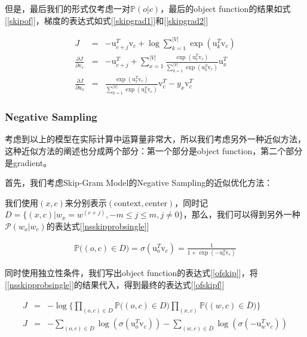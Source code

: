 \documentclass{article}
\begin{document}
但是，最后我们的形式仅考虑一对$\mathbb{P}(o\lvert c)$，最后的object function的结果如式[\ref{skipof}]，梯度的表达式如式[\ref{skipgrad1}]和[\ref{skipgrad2}]

\begin{eqnarray}
\label{skipof}
J &=& -\mathrm{u}_{c+j}^T\mathrm{v}_c + \log\sum_{k=1}^{\lvert V\rvert}{\exp(\mathrm{u}_k^T\mathrm{v}_c)} \\
\label{skipgrad1}
\frac{\partial J}{\partial \mathrm{v}_c}&=&-\mathrm{u}_{c+j}^T+\sum_{x=1}^{\lvert V\rvert}{\frac{\exp(\mathrm{u}_x^T\mathrm{v}_c)}{\sum_{k=1}^{\lvert V\rvert}{\exp(\mathrm{u}_k^T\mathrm{v}_c)}}\mathrm{u}_x^T} \\
\label{skipgrad2}
\frac{\partial J}{\partial \mathrm{u}_x}&=&\frac{\exp(\mathrm{u}_x^T\mathrm{v}_c)}{\sum_{k=1}^{\lvert V\rvert}{\exp(\mathrm{u}_k^T\mathrm{v}_c)}}\mathrm{v}_c^T - y_x\mathrm{v}_c^T
\end{eqnarray}

\subsubsection*{Negative Sampling}

考虑到以上的模型在实际计算中运算量非常大，所以我们考虑另外一种近似方法，这种近似方法的阐述也分成两个部分：第一个部分是object function，第二个部分是gradient。

首先，我们考虑Skip-Gram Model的Negative Sampling的近似优化方法：

我们使用$(x,c)$来分别表示$(\text{context},\text{center})$，同时记$D=\{(x,c)\lvert w_x=w^{(c+j)}, -m\le j\le m, j\neq 0\}$，那么，我们可以得到另外一种$\mathcal{P}(w_o\lvert w_c)$的表达式[\ref{nsskipprobsingle}]

\begin{eqnarray}
\label{nsskipprobsingle}
\mathbb{P}\big((o,c)\in D\big) = \sigma(\mathrm{u}_o^T\mathrm{v}_c) = \frac{1}{1+\exp(-\mathrm{u}_o^T\mathrm{v}_c)}
\end{eqnarray}

同时使用独立性条件，我们写出object function的表达式[\ref{ofskip}]，将[\ref{nsskipprobsingle}]的结果代入，得到最终的表达式[\ref{ofskipf}]

\begin{eqnarray}
\label{ofskip}
J &=& -\log\Big\{\prod_{(o,c) \in D}{\mathbb{P}\big((o,c) \in D\big)}\prod_{(x,c)}{\mathbb{P}\big((w,c) \in \bar{D}\big)}\Big\} \\
\label{ofskipf}
J &=& -\sum_{(o,c) \in D}{\log(\sigma(\mathrm{u}_o^T\mathrm{v}_c))} - \sum_{(w,c) \in \bar{D}}{\log(\sigma(-\mathrm{u}_w^T\mathrm{v}_c))}
\end{eqnarray}
\end{document}
